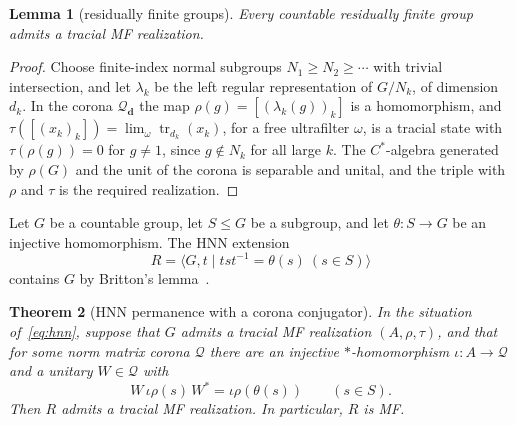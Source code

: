 \documentclass[11pt]{amsart}
\newcommand{\leanverified}[2]{\ignorespaces}
\newtheorem{theorem}{Theorem}[section]
\newtheorem{lemma}[theorem]{Lemma}
\theoremstyle{remark}
\theoremstyle{plain}
\begin{document}
\begin{lemma}[residually finite groups]\label{lem:rf-regular}
Every countable residually finite group admits a tracial MF realization.
\leanverified{Manuscript/OneSidedMFRadical/HNNCoronaConjugatorSentenceAudit}{GroupApproximation.Manuscript.OneSidedMFRadical.HNNCoronaConjugatorSentenceAudit.residuallyFinite_isRegularlyRealized}
\end{lemma}

\begin{proof}
Choose finite-index normal subgroups $N_1\ge N_2\ge\cdots$ with trivial
intersection, and let $\lambda_k$ be the left regular representation of
$G/N_k$, of dimension $d_k$.  In the corona $\mathcal Q_{\mathbf d}$ the
map $\rho(g)=[(\lambda_k(g))_k]$ is a homomorphism, and
$\tau([(x_k)_k])=\lim_\omega\operatorname{tr}_{d_k}(x_k)$, for a free
ultrafilter $\omega$, is a tracial state with $\tau(\rho(g))=0$ for
$g\ne1$, since $g\notin N_k$ for all large $k$.  The $C^*$-algebra
generated by $\rho(G)$ and the unit of the corona is separable and unital,
and the triple with $\rho$ and $\tau$ is the required realization.
\end{proof}

Let $G$ be a countable group, let $S\le G$ be a subgroup, and let
$\theta\colon S\to G$ be an injective homomorphism.  The HNN extension
\begin{equation}\label{eq:hnn}
 R=\langle G,t\mid tst^{-1}=\theta(s)\ (s\in S)\rangle
\end{equation}
contains $G$ by Britton's lemma~\cite{Britton}.
\leanverified{Manuscript/OneSidedMFRadical/HNNCoronaConjugatorSentenceAudit}{GroupApproximation.Manuscript.OneSidedMFRadical.HNNCoronaConjugatorSentenceAudit.hnnExtension_base_injective}

\begin{theorem}[HNN permanence with a corona conjugator]\label{thm:hnn-permanence}
In the situation of~\eqref{eq:hnn}, suppose that $G$ admits a tracial
MF realization $(A,\rho,\tau)$, and that for some norm matrix corona
$\mathcal Q$ there are an injective $*$-homomorphism
$\iota\colon A\to\mathcal Q$ and a unitary $W\in\mathcal Q$ with
\[
 W\,\iota\rho(s)\,W^*=\iota\rho(\theta(s))
 \qquad(s\in S).
\]
Then $R$ admits a tracial MF realization.  In particular, $R$ is MF\@.
\end{theorem}
\end{document}
